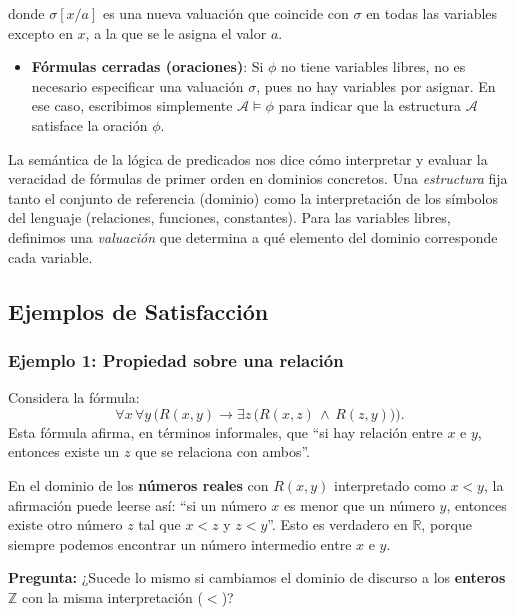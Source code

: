 donde $\sigma[x/a]$ es una nueva valuación que coincide con $\sigma$ en todas las variables excepto en $x$, a la que se le asigna el valor $a$.

\begin{itemize}
\item \textbf{Fórmulas cerradas (oraciones)}: Si $\phi$ no tiene variables libres, no es necesario especificar una valuación $\sigma$, pues no hay variables por asignar. En ese caso, escribimos simplemente $\mathcal{A} \models \phi$ para indicar que la estructura $\mathcal{A}$ satisface la oración $\phi$.
\end{itemize}

La semántica de la lógica de predicados nos dice cómo interpretar y evaluar la veracidad de fórmulas de primer orden en dominios concretos. Una \emph{estructura} fija tanto el conjunto de referencia (dominio) como la interpretación de los símbolos del lenguaje (relaciones, funciones, constantes). Para las variables libres, definimos una \emph{valuación} que determina a qué elemento del dominio corresponde cada variable. 

\subsection{Ejemplos de Satisfacción}

\subsubsection*{Ejemplo 1: Propiedad sobre una relación}
Considera la fórmula:
\[
    \forall x \,\forall y \,\bigl(R(x,y) \rightarrow \exists z\,\bigl(R(x,z)\,\land\, R(z,y)\bigr)\bigr).
\]
Esta fórmula afirma, en términos informales, que “si hay relación entre $x$ e $y$, entonces existe un $z$ que se relaciona con ambos”. 

En el dominio de los \textbf{números reales} con $R(x,y)$ interpretado como $x < y$, la afirmación puede leerse así: “si un número $x$ es menor que un número $y$, entonces existe otro número $z$ tal que $x < z$ y $z < y$”. Esto es verdadero en $\mathbb{R}$, porque siempre podemos encontrar un número intermedio entre $x$ e $y$.

\textbf{Pregunta:} ¿Sucede lo mismo si cambiamos el dominio de discurso a los \textbf{enteros} $\mathbb{Z}$ con la misma interpretación ($<$)?  


